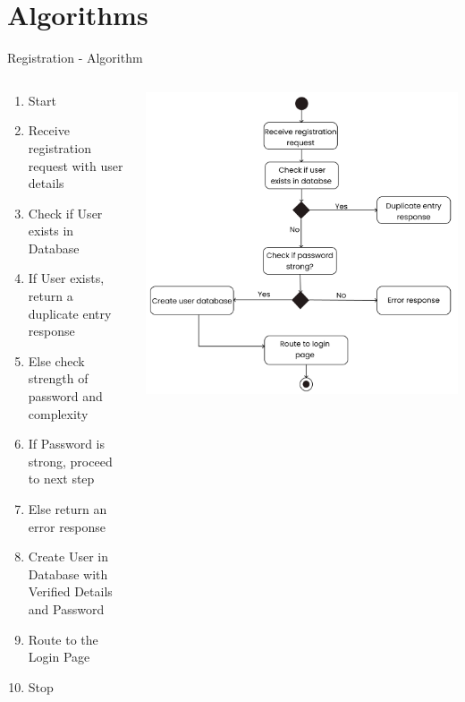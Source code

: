 \documentclass{beamer}
\begin{document}
\section{Algorithms}
\begin{frame}{Registration - Algorithm}
  \setlength{\itemsep}{4pt}
   \begin{columns}[T]
        \begin{column}{0.55\textwidth}
        \fontsize{7}{9}\selectfont
        \begin{enumerate}
             \item Start
           \item  Receive registration request with user details 
            \item Check if User exists in Database
            \item If User exists, return a duplicate entry response
            \item Else check strength of password and complexity
            \item If Password is strong, proceed to next step
            \item Else return an error response
            \item Create User in Database with Verified Details and Password
            \item Route to the Login Page
            \item Stop
        \end{enumerate}
        \end{column}
        \begin{column}{0.6\textwidth}
            \includegraphics[width=\linewidth]{assets/Registration_state_chart.png} 
        \end{column}
    \end{columns}
    \end{frame}
\end{document}
